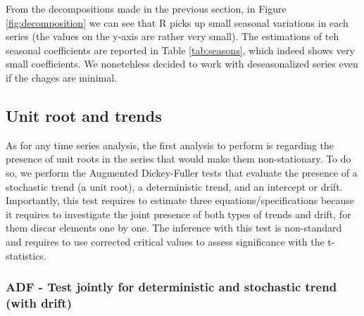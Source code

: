 \documentclass[hidelinks,12pts]{article}
\DeclareMathOperator{\1}{\mathbbm{1}}
\begin{document}
From the decompositions made in the previous section, in Figure \ref{fig:decomposition} we can see that R picks up small seasonal variations in each series (the values on the y-axis are rather very small). 
The estimations of teh seasonal coefficients are reported in Table \ref{tab:seasons}, which indeed shows very small coefficients.
We nonetehless decided to work with deseasonalized series even if the chages are minimal.







    \subsection{Unit root and trends}

As for any time series analysis, the first analysis to perform is regarding the presence of unit roots in the series that would make them non-stationary. 
To do so, we perform the Augmented Dickey-Fuller tests that evaluate the presence of a stochastic trend (a unit root), a deterministic trend, and an intercept or drift. 
Importantly, this test requires to estimate three equations/specifications because it requires to investigate the joint presence of both types of trends and drift, for them discar elements one by one. 
The inference with this test is non-standard and requires to use corrected critical values to assess significance with the t-statistics. 



\subsubsection{ADF - Test jointly for deterministic and stochastic trend (with drift)}
\end{document}
